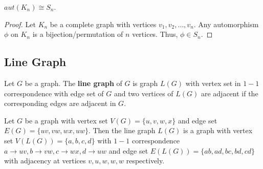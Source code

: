 \begin{exercise}
	$aut(K_n) \cong S_n$.
\end{exercise}
\begin{proof}
	Let $K_n$ be a complete graph with vertices $v_1,v_2,\dots,v_n$.
	Any automorphism $\phi$ on $K_n$ is a bijection/permutation of $n$ vertices. Thus, $\phi \in S_n$.
\end{proof}
\subsection{Line Graph}
\begin{definition}
	Let $G$ be a graph. The \textbf{line graph} of $G$ is graph $L(G)$ with vertex set in $1-1$ correspondence with edge set of $G$ and two vertices of $L(G)$ are adjacent if the corresponding edges are adjacent in $G$.
\end{definition}
\begin{commentary}
	Let $G$ be a graph with vertex set $V(G) = \{ u,v,w,x \}$ and edge set $E(G) = \{ uv, vw, wx, uw \}$. Then the line graph $L(G)$ is a graph with vertex set $V(L(G)) = \{ a,b,c,d \}$ with $1-1$ correspondence $a \to uv, b \to vw, c \to wx, d \to uw$ and edge set $E(L(G)) = \{ ab, ad, bc, bd, cd \}$ with adjacency at vertices $v,u,w,w,w$ respectively.
\end{commentary}


